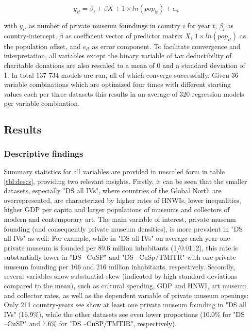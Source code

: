 \documentclass[11pt]{article}
\begin{document}
\begin{equation*}
y_{it} = \beta_i + \beta X + 1 \times ln(pop_{it}) + \epsilon_{it}
\end{equation*}

with \(y_{it}\) as number of private museum foundings in country \(i\) for year \(t\), \(\beta_i\) as country-intercept, \(\beta\) as coefficient vector of predictor matrix \(X\), \(1 \times ln(pop_{it})\) as the population offset, and \(e_{it}\) as error component.
To facilitate convergence and interpretation, all variables except the binary variable of tax deductibility of charitable donations are also rescaled to a mean of 0 and a standard deviation of 1. 
In total 137 734 models are run, all of which converge successfully. 
Given 36 variable combinations which are optimized four times with different starting values each per three datasets this results in an average of 320 regression models per variable combination.



\subsection*{Results}


\subsubsection*{Descriptive findings}


Summary statistics for all variables are provided in unscaled form in table \ref{tbl:descs}, providing two relevant insights. 
Firstly, it can be seen that the smaller datasets, especially "DS all IVs", where countries of the Global North are overrepresented, are characterized by higher rates of HNWIs, lower inequalities, higher GDP per capita and larger populations of museums and collectors of modern and contemporary art.
The main variable of interest, private museum founding (and consequently private museum densities), is more prevalent in "DS all IVs" as well: 
For example, while in "DS all IVs" on average each year one private museum is founded per 89.6 million inhabitants (1/0.0112), this rate is substantially lower in "DS --CuSP" and "DS --CuSp/TMITR" with one private museum founding per 166 and 216 million inhabitants, respectively.
Secondly, several variables show substantial skew (indicated by high standard deviations compared to the mean), such as cultural spending, GDP and HNWI, art museum and collector rates, as well as the dependent variable of private museum openings: 
Only 211 country-years see show at least one private museum founding in "DS all IVs" (16.9\%), while the other datasets see even lower proportions (10.0\% for "DS --CuSP" and 7.6\% for "DS --CuSP/TMTIR", respectively).
\end{document}
